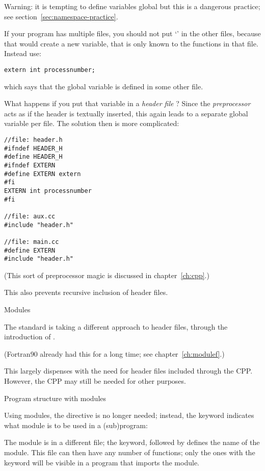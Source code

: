 Warning: it is tempting to define variables global but this is a
dangerous practice; see section~\ref{sec:namespace-practice}.

If your program has multiple files, you should not put `'
in the other files, because that would create a new variable, that is
only known to the functions in that file. Instead use:
\begin{lstlisting}
extern int processnumber;
\end{lstlisting}
which says that the global variable  is defined in
some other file.

What happens if you put that variable in a
%
\emph{header file}%
%
? Since the
%
\emph{preprocessor}%
acts as if the header is textually inserted, this again leads to
a separate global variable per file. The solution then is more
complicated:
\begin{lstlisting}
//file: header.h
#ifndef HEADER_H
#define HEADER_H
#ifndef EXTERN
#define EXTERN extern
#fi
EXTERN int processnumber
#fi

//file: aux.cc
#include "header.h"

//file: main.cc
#define EXTERN
#include "header.h"
\end{lstlisting}
(This sort of preprocessor magic is discussed in chapter~\ref{ch:cpp}.)

This also prevents recursive inclusion of header files.

 {Modules}
\label{sec:module}

The  standard is taking a different approach
to header files, through the introduction of .
\begin{fortranbook}
  (Fortran90 already had this for a long time; see chapter~\ref{ch:modulef}.)
\end{fortranbook}
This largely dispenses with the need for
header files included through the \ac{CPP}.
However, the \ac{CPP} may still be needed for other purposes.

 {Program structure with modules}

Using modules, the  directive is no longer needed;
instead, the  keyword indicates what module is to be used
in a (sub)program:
%

The module is in a different file; the
 keyword,
followed by  defines the name of the module.
This file can then have any number of functions;
only the ones with the  keyword will be
visible in a program that imports the module.
%

